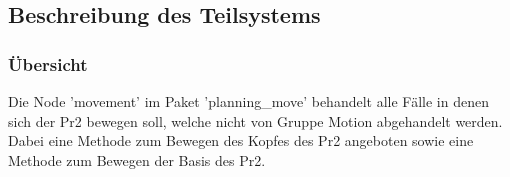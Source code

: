 \documentclass{suturo}
\begin{document}
\subsection{Beschreibung des Teilsystems}
\subsubsection{\"Ubersicht}
Die Node 'movement' im Paket 'planning\_move' behandelt alle Fälle in denen sich der Pr2 bewegen soll, welche nicht von Gruppe Motion abgehandelt werden. Dabei eine Methode zum Bewegen des Kopfes des Pr2 angeboten sowie eine Methode zum Bewegen der Basis des Pr2.
\end{document}

